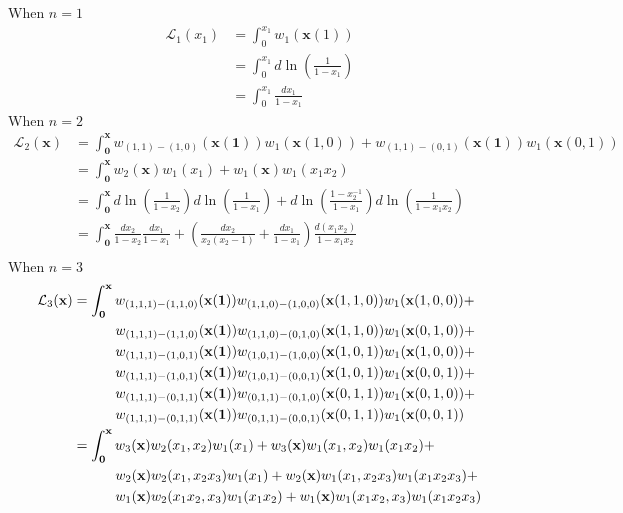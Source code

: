 \documentclass[main]{subfiles}
\begin{document}
\begin{example}
When $n=1$
\begin{align*}
\mathcal L_1(x_1)&=\int_0^{x_1}w_1(\mathbf x(1)) \\
&=\int_0^{x_1}d\ln\left(\frac{1}{1-x_1}\right) \\
&=\int_0^{x_1}\frac{dx_1}{1-x_1}
\end{align*}
When $n=2$
\begin{align*}
\mathcal L_{2}(\mathbf x)&=\int_{\mathbf 0}^{\mathbf x}w_{(1,1)-(1,0)}(\mathbf x(\mathbf 1))w_1(\mathbf x(1,0))+w_{(1,1)-(0,1)}(\mathbf x(\mathbf 1))w_1(\mathbf x(0,1)) \\
&=\int_{\mathbf 0}^{\mathbf x}w_{2}(\mathbf x)w_1(x_1)+w_{1}(\mathbf x)w_1(x_1x_2) \\
&=\int_{\mathbf 0}^{\mathbf x}d\ln\left(\frac{1}{1-x_2}\right)d\ln\left(\frac{1}{1-x_1}\right)+d\ln\left(\frac{1-x_2^{-1}}{1-x_1}\right)d\ln\left(\frac{1}{1-x_1x_2}\right) \\
&=\int_{\mathbf 0}^{\mathbf x}\frac{dx_2}{1-x_2}\frac{dx_1}{1-x_1}+\left(\frac{dx_2}{x_2(x_2-1)}+\frac{dx_1}{1-x_1}\right)\frac{d(x_1x_2)}{1-x_1x_2} \\
\end{align*}
When $n=3$
\begin{align*}
\mathcal L_{3}(\mathbf x)&=\int_{\mathbf0}^{\mathbf x}w_{(1,1,1)-(1,1,0)}(\mathbf x(\mathbf 1))w_{(1,1,0)-(1,0,0)}(\mathbf x(1,1,0))w_1(\mathbf x(1,0,0))+ \\
&\mkern55mu w_{(1,1,1)-(1,1,0)}(\mathbf x(\mathbf 1))w_{(1,1,0)-(0,1,0)}(\mathbf x(1,1,0))w_1(\mathbf x(0,1,0))+ \\
&\mkern55mu w_{(1,1,1)-(1,0,1)}(\mathbf x(\mathbf 1))w_{(1,0,1)-(1,0,0)}(\mathbf x(1,0,1))w_1(\mathbf x(1,0,0))+ \\
&\mkern55mu w_{(1,1,1)-(1,0,1)}(\mathbf x(\mathbf 1))w_{(1,0,1)-(0,0,1)}(\mathbf x(1,0,1))w_1(\mathbf x(0,0,1))+ \\
&\mkern55mu w_{(1,1,1)-(0,1,1)}(\mathbf x(\mathbf 1))w_{(0,1,1)-(0,1,0)}(\mathbf x(0,1,1))w_1(\mathbf x(0,1,0))+ \\
&\mkern55mu w_{(1,1,1)-(0,1,1)}(\mathbf x(\mathbf 1))w_{(0,1,1)-(0,0,1)}(\mathbf x(0,1,1))w_1(\mathbf x(0,0,1)) \\
&=\int_{\mathbf0}^{\mathbf x}w_{3}(\mathbf x)w_{2}(x_1,x_2)w_1(x_1)+w_{3}(\mathbf x)w_{1}(x_1,x_2)w_1(x_1x_2)+ \\
&\mkern55mu w_{2}(\mathbf x)w_{2}(x_1,x_2x_3)w_1(x_1)+w_{2}(\mathbf x)w_{1}(x_1,x_2x_3)w_1(x_1x_2x_3)+ \\
&\mkern55mu w_{1}(\mathbf x)w_{2}(x_1x_2,x_3)w_1(x_1x_2)+w_{1}(\mathbf x)w_{1}(x_1x_2,x_3)w_1(x_1x_2x_3) \\

\end{align*}
\end{example}
\end{document}
